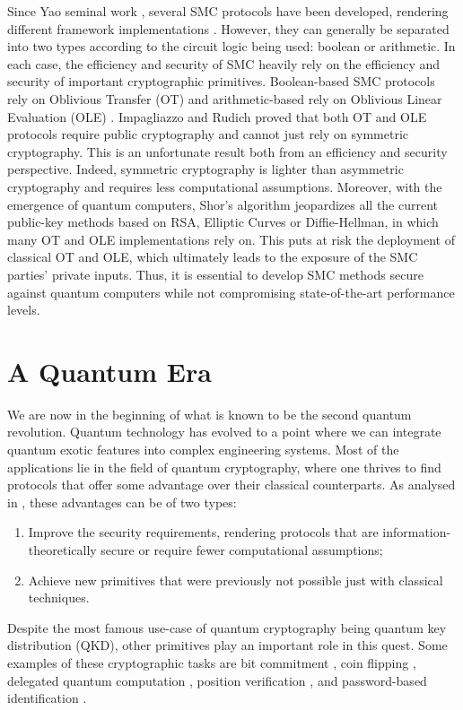 Since Yao seminal work \cite{Y86}, several SMC protocols have been developed, rendering different framework implementations \cite{Goldreich87, Bendlin11, D12}. However, they can generally be separated into two types according to the circuit logic being used: boolean or arithmetic. In each case, the efficiency and security of SMC heavily rely on the efficiency and security of important cryptographic primitives. Boolean-based SMC protocols rely on Oblivious Transfer (OT) \cite{K88} and arithmetic-based rely on Oblivious Linear Evaluation (OLE) \cite{DPSZ12}. Impagliazzo and Rudich \cite{IR99} proved that both OT and OLE protocols require public cryptography and cannot just rely on symmetric cryptography. This is an unfortunate result both from an efficiency and security perspective. Indeed, symmetric cryptography is lighter than asymmetric cryptography and requires less computational assumptions. Moreover, with the emergence of quantum computers, Shor’s algorithm \cite{Sho95} jeopardizes all the current public-key methods based on RSA, Elliptic Curves or Diffie-Hellman, in which many OT and OLE implementations rely on. This puts at risk the deployment of classical OT and OLE, which ultimately leads to the exposure of the SMC parties’ private inputs. Thus, it is essential to develop SMC methods secure against quantum computers while not compromising state-of-the-art performance levels.


\section*{A Quantum Era}

We are now in the beginning of what is known to be
the second quantum revolution. Quantum technology has evolved to a point where we can integrate quantum exotic features into complex engineering systems. Most of the applications lie in the field of quantum cryptography, where one thrives to find protocols that offer some advantage over their classical counterparts. As analysed in \cite{B15, PSAN13}, these advantages can be of two types:

\begin{enumerate}
    \item Improve the security requirements, rendering protocols that are information-theoretically secure or require fewer computational assumptions;
    \item Achieve new primitives that were previously not possible just with classical techniques.
\end{enumerate}
Despite the most famous use-case of quantum cryptography being quantum key distribution (QKD), other primitives play an important role in this quest. Some examples of these cryptographic tasks are bit commitment \cite{CK11}, coin flipping \cite{CK09}, delegated quantum computation \cite{BFK09}, position verification \cite{Unr14}, and password-based identification \cite{DFSS14, DFLSS09}. 

